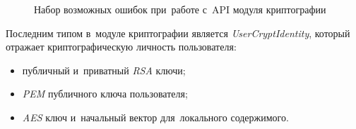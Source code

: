 \begin{figure}[h]
	
   \caption{Набор возможных ошибок при~работе с~API модуля криптографии}
   \label{sec:development:client:encryption:code:errors}
\end{figure}

Последним типом в~модуле криптографии является \textit{UserCryptIdentity}, который отражает криптографическую личность пользователя:
\begin{itemize}
	\item публичный и~приватный \textit{RSA} ключи;
	\item \textit{PEM} публичного ключа пользователя;
	\item \textit{AES} ключ и~начальный вектор для~локального содержимого.
\end{itemize}